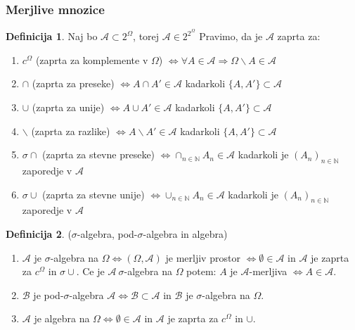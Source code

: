 \documentclass[a4paper,12pt]{article}
\theoremstyle{definition} %
\newtheorem{definicija}{Definicija}[section]
\theoremstyle{plain} %
\newcommand{\N}{\mathbb{N}}
\newcommand{\A}{\mathcal{A}}
\begin{document}
        \subsubsection{Merjlive mnozice}
            \begin{definicija}
                Naj bo $\mathcal{A} \subset 2^\Omega$, torej $\mathcal{A} \in 2^{2^\Omega}$ Pravimo, da je $\mathcal{A}$ zaprta za:
                \begin{enumerate}
                    \item $c^\Omega$ (zaprta za komplemente v $\Omega$) $\iff \forall A \in \mathcal{A} \Rightarrow \Omega \backslash A \in \mathcal{A} $
                    \item $\cap $ (zaprta za preseke) $\iff A \cap A' \in \mathcal{A}$ kadarkoli $\{A, A'\} \subset \mathcal{A}$
                    \item $\cup$ (zaprta za unije) $\iff  A \cup A' \in \mathcal{A}$ kadarkoli $\{A, A'\} \subset \mathcal{A}$
                    \item $\backslash$ (zaprta za razlike) $\iff A \backslash A' \in \mathcal{A}$ kadarkoli $\{A, A'\} \subset \mathcal{A}$
                    \item $\sigma\cap$ (zaprta za stevne preseke) $\iff \cap_{n \in \N}A_n \in \mathcal{A}$ kadarkoli je $\left(A_n \right)_{n \in \N}$ zaporedje v $\mathcal{A}$
                    \item $\sigma\cup$ (zaprta za stevne unije) $\iff \cup_{n \in \N}A_n \in \mathcal{A} $ kadarkoli je $\left(A_n \right)_{n \in \N}$ zaporedje v $\mathcal{A}$
                
                \end{enumerate} 
            \end{definicija}
            
            \begin{definicija}($\sigma$-algebra, pod-$\sigma$-algebra in algebra)
                \begin{enumerate}
                    \item$\mathcal{A}$ je $\sigma$-algebra na $\Omega \iff (\Omega, \A)$ je merljiv prostor $\iff \emptyset \in \mathcal{A}$ in $\mathcal{A}$ je zaprta za $c^\Omega$ in $\sigma\cup$. Ce je $\mathcal{A} \ \sigma$-algebra na $\Omega$ potem: $A$ je $\mathcal{A}$-merljiva $\iff A \in \mathcal{A}.$
                    \item $\mathcal{B}$ je pod-$\sigma$-algebra $\mathcal{A} \iff \mathcal{B} \subset \mathcal{A}$ in $\mathcal{B}$ je $\sigma$-algebra na $\Omega$.
                    \item $\mathcal{A}$ je algebra na $\Omega \iff \emptyset \in \mathcal{A}$ in $\mathcal{A}$ je zaprta za $c^\Omega$ in $\cup$.
                \end{enumerate}
            \end{definicija}
\end{document}
